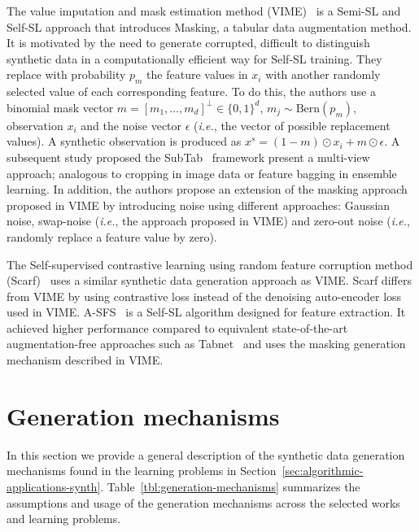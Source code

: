 The value imputation and mask estimation method (VIME)~\cite{yoon2020vime} is
a Semi-SL and Self-SL approach that introduces Masking, a tabular data
augmentation method. It is motivated by the need to generate corrupted,
difficult to distinguish synthetic data in a computationally efficient way for
Self-SL training. They replace with probability $p_m$ the feature values in $x_i$
with another randomly selected value of each corresponding feature. To do
this, the authors use a binomial mask vector $m=[m_1, \ldots, m_d]^\bot \in
\{0,1\}^d$, $m_j \sim \text{Bern}(p_m)$, observation $x_i$ and the noise vector
$\epsilon$ (\textit{i.e.}, the vector of possible replacement values). A
synthetic observation is produced as $x^s=(1-m) \odot x_i + m \odot \epsilon$.
A subsequent study proposed the SubTab~\cite{ucar2021subtab} framework present
a multi-view approach; analogous to cropping in image data or feature bagging
in ensemble learning. In addition, the authors propose an extension of the
masking approach proposed in VIME by introducing noise using different
approaches: Gaussian noise, swap-noise (\textit{i.e.}, the approach proposed
in VIME) and zero-out noise (\textit{i.e.}, randomly replace a feature value
by zero).

The Self-supervised contrastive learning using random feature corruption
method (Scarf)~\cite{bahri2022scarf} uses a similar synthetic data generation
approach as VIME. Scarf differs from VIME by using contrastive loss instead of
the denoising auto-encoder loss used in VIME. A-SFS~\cite{qiu2022sfs} is a
Self-SL algorithm designed for feature extraction. It achieved higher
performance compared to equivalent state-of-the-art augmentation-free
approaches such as Tabnet~\cite{arik2021tabnet} and uses the masking
generation mechanism described in VIME.



\section{Generation mechanisms}\label{sec:generation-mechanisms-synth}

In this section we provide a general description of the synthetic data
generation mechanisms found in the learning problems in
Section~\ref{sec:algorithmic-applications-synth}.
Table~\ref{tbl:generation-mechanisms} summarizes the assumptions and
usage of the generation mechanisms across the selected works and learning
problems.

